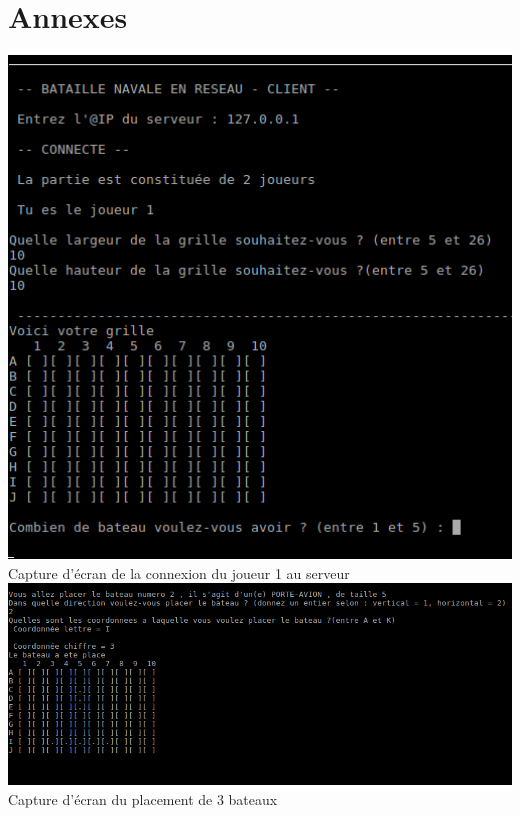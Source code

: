 \documentclass[a4paper,12pt]{article}
\begin{document}
\section {Annexes}  
\begin{center}
    \includegraphics[width=1\textwidth] {capture_ecran_connexion_joueur1.png}  
    Capture d'écran de la connexion du joueur 1 au serveur \\
    \newpage
    \includegraphics[width=1\textwidth] {Capture_ecran_placement_bateau.png}  
    Capture d'écran du placement de 3 bateaux
    \newpage

\end{center}
\end{document}
